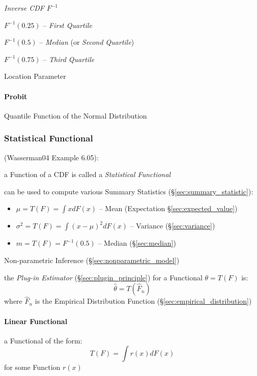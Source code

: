 \emph{Inverse CDF} $F^{-1}$

$F^{-1}(0.25)$ -- \emph{First Quartile}

$F^{-1}(0.5)$ -- \emph{Median} (or \emph{Second Quartile})

$F^{-1}(0.75)$ -- \emph{Third Quartile}

Location Parameter



\paragraph{Probit}\label{sec:probit}\hfill

Quantile Function of the Normal Distribution



\subsubsection{Statistical Functional}\label{sec:statistical_functional}

(Wasserman04 Example 6.05):

a Function of a CDF is called a \emph{Statistical Functional}

can be used to compute various Summary Statistics
(\S\ref{sec:summary_statistic}):
\begin{itemize}
  \item $\mu = T(F) = \int x dF(x)$
    -- Mean (Expectation \S\ref{sec:expected_value})
  \item $\sigma^2 = T(F) = \int (x - \mu)^2 dF(x)$
    -- Variance (\S\ref{sec:variance})
  \item $m = T(F) = F^{-1}(0.5)$
    -- Median (\S\ref{sec:median})
\end{itemize}

Non-parametric Inference (\S\ref{sec:nonparametric_model})

the \emph{Plug-in Estimator} (\S\ref{sec:plugin_principle}) for a Functional
$\theta = T(F)$ is:
\[
  \hat{\theta} = T(\hat{F}_n)
\]
where $\hat{F}_n$ is the Empirical Distribution Function
(\S\ref{sec:empirical_distribution})



\paragraph{Linear Functional}\label{sec:linear_functional}\hfill

a Functional of the form:
\[
  T(F) = \int r(x) dF(x)
\]
for some Function $r(x)$

